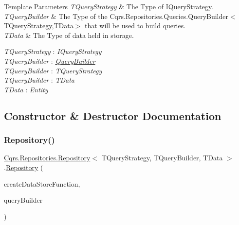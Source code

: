 \begin{DoxyTemplParams}{Template Parameters}
{\em T\+Query\+Strategy} & The Type of I\+Query\+Strategy.\\
\hline
{\em T\+Query\+Builder} & The Type of the Cqrs.\+Repositories.\+Queries.\+Query\+Builder$<$\+T\+Query\+Strategy,\+T\+Data$>$ that will be used to build queries.\\
\hline
{\em T\+Data} & The Type of data held in storage.\\
\hline
\end{DoxyTemplParams}
\begin{Desc}
\item[Type Constraints]\begin{description}
\item[{\em T\+Query\+Strategy} : {\em I\+Query\+Strategy}]\item[{\em T\+Query\+Builder} : {\em \hyperlink{classCqrs_1_1Repositories_1_1Repository_a4447451b7dbcfcd68dfa3fa65a41f357_a4447451b7dbcfcd68dfa3fa65a41f357}{Query\+Builder}}]\item[{\em T\+Query\+Builder} : {\em T\+Query\+Strategy}]\item[{\em T\+Query\+Builder} : {\em T\+Data}]\item[{\em T\+Data} : {\em Entity}]\end{description}
\end{Desc}


\subsection{Constructor \& Destructor Documentation}
\mbox{\label{classCqrs_1_1Repositories_1_1Repository_a2f4009847fa03a897c6698fd5a92d89f_a2f4009847fa03a897c6698fd5a92d89f}} 
\subsubsection{\texorpdfstring{Repository()}{Repository()}}
{\footnotesize\ttfamily \hyperlink{classCqrs_1_1Repositories_1_1Repository}{Cqrs.\+Repositories.\+Repository}$<$ T\+Query\+Strategy, T\+Query\+Builder, T\+Data $>$.\hyperlink{classCqrs_1_1Repositories_1_1Repository}{Repository} (\begin{DoxyParamCaption}\item[{Func$<$ \hyperlink{interfaceCqrs_1_1DataStores_1_1IDataStore}{I\+Data\+Store}$<$ T\+Data $>$$>$}]{create\+Data\+Store\+Function,  }\item[{T\+Query\+Builder}]{query\+Builder }\end{DoxyParamCaption})\hspace{0.3cm}{\ttfamily [protected]}}



